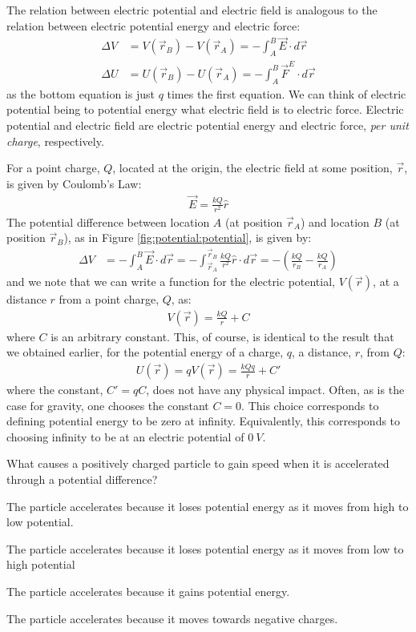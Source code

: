 The relation between electric potential and electric field is analogous to the relation between electric potential energy and electric force:
\begin{align*}
\Delta V &=V(\vec r_B)-V(\vec r_A)=-\int_A^B  \vec E\cdot d\vec r\\
\Delta U &=U(\vec r_B)-U(\vec r_A)=-\int_A^B  \vec F^E\cdot d\vec r
\end{align*}
as the bottom equation is just $q$ times the first equation. We can think of electric potential being to potential energy what electric field is to electric force. Electric potential and electric field are electric potential energy and electric force, \textit{per unit charge}, respectively.

For a point charge, $Q$, located at the origin, the electric field at some position, $\vec r$, is given by Coulomb's Law:
\begin{align*}
\vec E=\frac{kQ}{r^2}\hat r
\end{align*}
The potential difference between location $A$ (at position $\vec r_A$) and location $B$ (at position $\vec r_B$), as in Figure \ref{fig:potential:potential}, is given by:
\begin{align*}
\Delta V &=- \int_A^B  \vec E\cdot d\vec r= -\int_{\vec r_A}^{\vec r_B}  \frac{kQ}{r^2}\hat r\cdot d\vec r=-\left(\frac{kQ}{r_B}-\frac{kQ}{r_A}\right)
\end{align*}
and we note that we can write a function for the electric potential, $V(\vec r)$, at a distance $r$ from a point charge, $Q$, as:
\begin{align*}
V(\vec r)=\frac{kQ}{r}+C
\end{align*}
where $C$ is an arbitrary constant. This, of course, is identical to the result that we obtained earlier, for the potential energy of a charge, $q$, a distance, $r$, from $Q$: 
\begin{align*}
U(\vec r)=qV(\vec r)=\frac{kQq}{r}+C'
\end{align*}
where the constant, $C'=qC$, does not have any physical impact. Often, as is the case for gravity, one chooses the constant $C=0$. This choice corresponds to defining potential energy to be zero at infinity. Equivalently, this corresponds to choosing infinity to be at an electric potential of $\SI{0}{V}$.

\begin{checkpoint}
	\begin{MCquestion}{What causes a positively charged particle to gain speed when it is accelerated through a potential difference?}
		\item The particle accelerates because it loses potential energy as it moves from high to low potential. \correct
		\item The particle accelerates because it loses potential energy as it moves from low to high potential
		\item The particle accelerates because it gains potential energy.
		\item The particle accelerates because it moves towards negative charges.
	\end{MCquestion}
\end{checkpoint}

